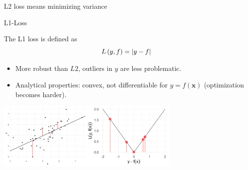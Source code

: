 \documentclass[11pt,compress,t,notes=noshow, xcolor=table]{beamer}
\begin{document}
\begin{vbframe}{L2 loss means minimizing variance}


\end{vbframe}

\begin{vbframe}{L1-Loss}

\vspace*{-0.1cm}
The L1 loss is defined as
$$
L\left(y, f\right) = \left|y-f\right|
$$

\begin{itemize}
\setlength{\itemsep}{1.5em}
\item More robust than $L2$, outliers in $y$ are less problematic.
\item Analytical properties: convex, not differentiable for $y = f(\bm{x})$ (optimization becomes harder).
\end{itemize}

\vspace*{0.2cm}

\begin{center}  \includegraphics[width = 9cm]{figure/loss_absolute_2.png} \\
\end{center}


\end{vbframe}
\end{document}
